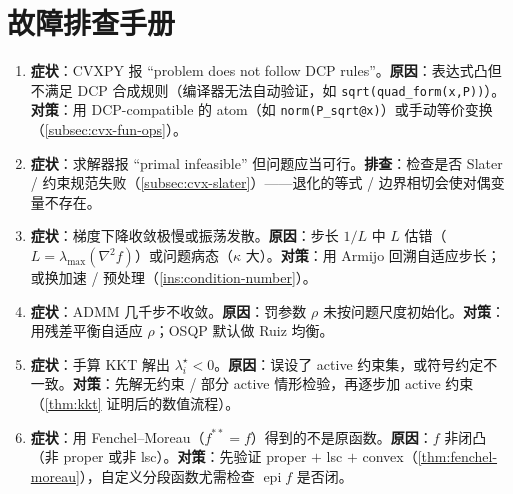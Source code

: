\section*{故障排查手册}
\begin{enumerate}
  \item \textbf{症状}：CVXPY 报 “problem does not follow DCP rules”。\textbf{原因}：表达式凸但不满足 DCP 合成规则（编译器无法自动验证，如 \texttt{sqrt(quad\_form(x,P))}）。\textbf{对策}：用 DCP-compatible 的 atom（如 \texttt{norm(P\_sqrt@x)}）或手动等价变换（\cref{subsec:cvx-fun-ops}）。
  \item \textbf{症状}：求解器报 “primal infeasible” 但问题应当可行。\textbf{排查}：检查是否 Slater / 约束规范失败（\cref{subsec:cvx-slater}）——退化的等式 / 边界相切会使对偶变量不存在。
  \item \textbf{症状}：梯度下降收敛极慢或振荡发散。\textbf{原因}：步长 $1/L$ 中 $L$ 估错（$L=\lambda_{\max}(\nabla^2 f)$）或问题病态（$\kappa$ 大）。\textbf{对策}：用 Armijo 回溯自适应步长；或换加速 / 预处理（\cref{ins:condition-number}）。
  \item \textbf{症状}：ADMM 几千步不收敛。\textbf{原因}：罚参数 $\rho$ 未按问题尺度初始化。\textbf{对策}：用残差平衡自适应 $\rho$；OSQP 默认做 Ruiz 均衡。
  \item \textbf{症状}：手算 KKT 解出 $\lambda_i^\star<0$。\textbf{原因}：误设了 active 约束集，或符号约定不一致。\textbf{对策}：先解无约束 / 部分 active 情形检验，再逐步加 active 约束（\cref{thm:kkt} 证明后的数值流程）。
  \item \textbf{症状}：用 Fenchel--Moreau（$f^{\ast\ast}=f$）得到的不是原函数。\textbf{原因}：$f$ 非闭凸（非 proper 或非 lsc）。\textbf{对策}：先验证 proper $+$ lsc $+$ convex（\cref{thm:fenchel-moreau}），自定义分段函数尤需检查 $\operatorname{epi}f$ 是否闭。
\end{enumerate}
